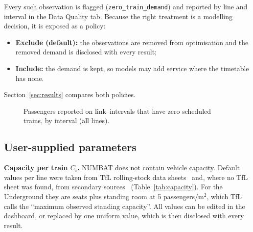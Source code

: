 \documentclass[conference]{IEEEtran}
\begin{document}
Every such observation is flagged (\texttt{zero\_train\_demand}) and reported by line and interval in the Data Quality
tab. Because the right treatment is a modelling decision, it is exposed as a policy:
\begin{itemize}
\item \textbf{Exclude (default):} the observations are removed from optimisation and the removed demand is disclosed
  with every result;
\item \textbf{Include:} the demand is kept, so models may add service where the timetable has none.
\end{itemize}
Section~\ref{sec:results} compares both policies.

\begin{figure}[!t]\centering
{}
\caption{Passengers reported on link--intervals that have zero scheduled trains, by interval (all lines).}\label{fig:zero}
\end{figure}

\subsection{User-supplied parameters}\label{sec:params}
\textbf{Capacity per train $C_i$.} NUMBAT does not contain vehicle capacity. Default values per line were taken from
TfL rolling-stock data sheets~\cite{tfl_rs4,tfl_345,tfl_378} and, where no TfL sheet was found, from secondary
sources~\cite{wiki_710,wiki_dlr,wiki_tram} (Table~\ref{tab:capacity}). For the Underground they are seats plus standing
room at 5 passengers/m$^2$, which TfL calls the ``maximum observed standing capacity''. All values can be edited in the
dashboard, or replaced by one uniform value, which is then disclosed with every result.
\end{document}
